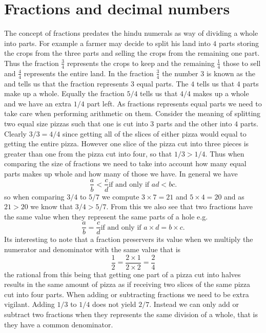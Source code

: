 \section{Fractions and decimal numbers}

The concept of fractions predates the hindu numerals as way of dividing a whole into parts. For example a farmer may decide to split his land into $4$ parts storing the crops from the three parts and selling the crops from the remaining one part. Thus the fraction $\frac{3}{4}$ represents the crops to keep and the remaining $\frac{1}{4}$ those to sell and $\frac{4}{4}$ represents the entire land. In the fraction $\frac{3}{4}$ the number $3$ is known as the  and tells us that the fraction represents $3$ equal parts. The  $4$ tells us that $4$ parts make up a whole. Equally the fraction $5/4$ tells us that $4/4$ makes up a whole and we have an extra $1/4$ part left. As fractions represents equal parts we need to take care when performing arithmetic on them. Consider the meaning of splitting two equal size pizzas such that one is cut into $3$ parts and the other into $4$ parts. Clearly $3/3 = 4/4$ since getting all of the slices of either pizza would equal to getting the entire pizza. However one slice of the pizza cut into three pieces is greater than one from the pizza cut into four, so that $1/3 > 1/4$. Thus when comparing the size of fractions we need to take into account how many equal parts makes up whole and how many of those we have. In general we have
\begin{equation}
\frac{a}{b} < \frac{c}{d} \text{if and only if $ad < bc$}.
\end{equation}
so when comparing $3/4$ to $5/7$ we compute $3 \times 7 = 21$ and $5 \times 4 = 20$ and as $21 > 20$ we know that $3/4 > 5/7$. From this we also see that two fractions have the same value when they represent the same parts of a hole e.g. 
\begin{equation}
\frac{a}{b} = \frac{c}{d} \text{if and only if $a \times d = b \times c$}.
\end{equation}
Its interesting to note that a fraction preservers its value when we multiply the numerator and denominator with the same value that is 
\[
\frac{1}{2} = \frac{2 \times 1}{2 \times 2} = \frac{2}{4} 
\]
the rational from this being that getting one part of a pizza cut into halves results in the same amount of pizza as if receiving two slices of the same pizza cut into four parts. When adding or subtracting fractions we need to be extra vigilant. Adding $1/3$ to $1/4$ does not yield $2/7$. Instead we can only add or subtract two fractions when they represents the same division of a whole, that is they have a common denominator.
